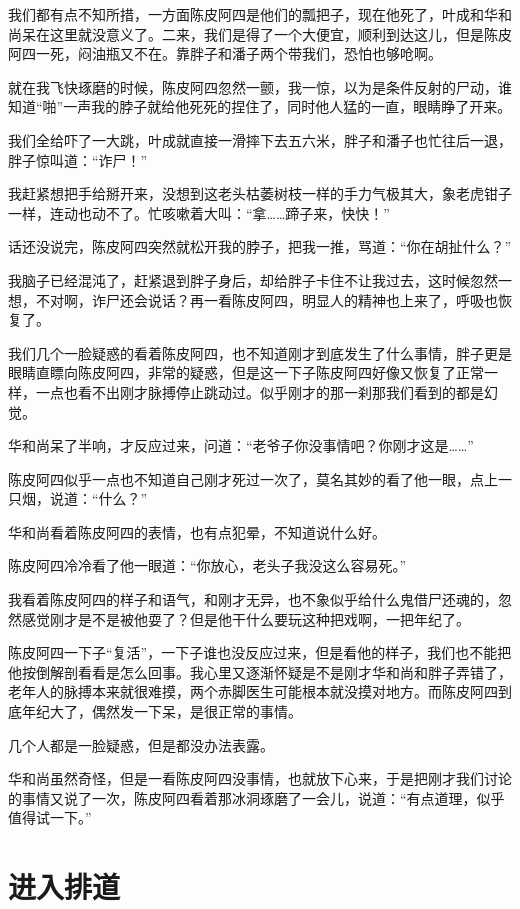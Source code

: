 我们都有点不知所措，一方面陈皮阿四是他们的瓢把子，现在他死了，叶成和华和尚呆在这里就没意义了。二来，我们是得了一个大便宜，顺利到达这儿，但是陈皮阿四一死，闷油瓶又不在。靠胖子和潘子两个带我们，恐怕也够呛啊。

就在我飞快琢磨的时候，陈皮阿四忽然一颤，我一惊，以为是条件反射的尸动，谁知道“啪”一声我的脖子就给他死死的捏住了，同时他人猛的一直，眼睛睁了开来。

我们全给吓了一大跳，叶成就直接一滑摔下去五六米，胖子和潘子也忙往后一退，胖子惊叫道：“诈尸！”

我赶紧想把手给掰开来，没想到这老头枯萎树枝一样的手力气极其大，象老虎钳子一样，连动也动不了。忙咳嗽着大叫：“拿……蹄子来，快快！”

话还没说完，陈皮阿四突然就松开我的脖子，把我一推，骂道：“你在胡扯什么？”

我脑子已经混沌了，赶紧退到胖子身后，却给胖子卡住不让我过去，这时候忽然一想，不对啊，诈尸还会说话？再一看陈皮阿四，明显人的精神也上来了，呼吸也恢复了。

我们几个一脸疑惑的看着陈皮阿四，也不知道刚才到底发生了什么事情，胖子更是眼睛直瞟向陈皮阿四，非常的疑惑，但是这一下子陈皮阿四好像又恢复了正常一样，一点也看不出刚才脉搏停止跳动过。似乎刚才的那一刹那我们看到的都是幻觉。

华和尚呆了半响，才反应过来，问道：“老爷子你没事情吧？你刚才这是……”

陈皮阿四似乎一点也不知道自己刚才死过一次了，莫名其妙的看了他一眼，点上一只烟，说道：“什么？”

华和尚看着陈皮阿四的表情，也有点犯晕，不知道说什么好。

陈皮阿四冷冷看了他一眼道：“你放心，老头子我没这么容易死。”

我看着陈皮阿四的样子和语气，和刚才无异，也不象似乎给什么鬼借尸还魂的，忽然感觉刚才是不是被他耍了？但是他干什么要玩这种把戏啊，一把年纪了。

陈皮阿四一下子“复活”，一下子谁也没反应过来，但是看他的样子，我们也不能把他按倒解剖看看是怎么回事。我心里又逐渐怀疑是不是刚才华和尚和胖子弄错了，老年人的脉搏本来就很难摸，两个赤脚医生可能根本就没摸对地方。而陈皮阿四到底年纪大了，偶然发一下呆，是很正常的事情。

几个人都是一脸疑惑，但是都没办法表露。

华和尚虽然奇怪，但是一看陈皮阿四没事情，也就放下心来，于是把刚才我们讨论的事情又说了一次，陈皮阿四看着那冰洞琢磨了一会儿，说道：“有点道理，似乎值得试一下。”

\chapter{进入排道}

